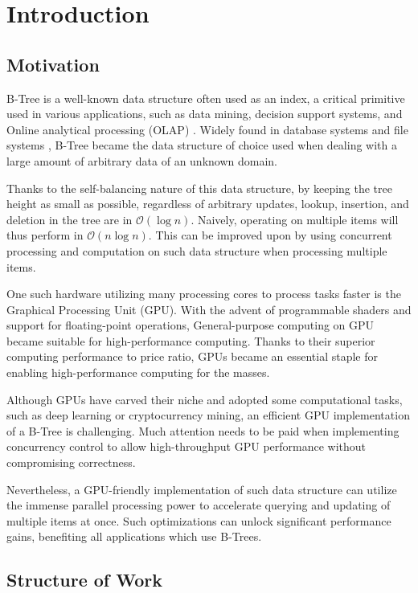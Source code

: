\chapter{Introduction}\label{chapter:introduction}

\section{Motivation}

B-Tree is a well-known data structure often used as an index, a critical primitive used in various applications, such as data mining, decision support systems, and Online analytical processing (OLAP) \cite{olap,goetz-tech}. Widely found in database systems and file systems \cite{postgresql,btrfs}, B-Tree became the data structure of choice used when dealing with a large amount of arbitrary data of an unknown domain.

Thanks to the self-balancing nature of this data structure, by keeping the tree height as small as possible, regardless of arbitrary updates, lookup, insertion, and deletion in the tree are in $\mathcal{O}(\log{n})$. Naively, operating on multiple items will thus perform in $\mathcal{O}(n \log{n})$. This can be improved upon by using concurrent processing and computation on such data structure when processing multiple items.

One such hardware utilizing many processing cores to process tasks faster is the Graphical Processing Unit (GPU). With the advent of programmable shaders and support for floating-point operations, General-purpose computing on GPU became suitable for high-performance computing. Thanks to their superior computing performance to price ratio, GPUs became an essential staple for enabling high-performance computing for the masses.

Although GPUs have carved their niche and adopted some computational tasks, such as deep learning or cryptocurrency mining, an efficient GPU implementation of a B-Tree is challenging. Much attention needs to be paid when implementing concurrency control to allow high-throughput GPU performance without compromising correctness.

Nevertheless, a GPU-friendly implementation of such data structure can utilize the immense parallel processing power to accelerate querying and updating of multiple items at once. Such optimizations can unlock significant performance gains, benefiting all applications which use B-Trees.

\section{Structure of Work}

